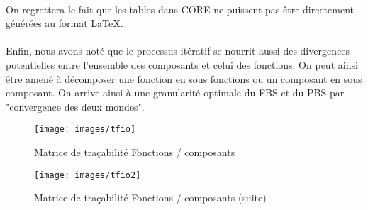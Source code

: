 \paragraph{}
On regrettera le fait que les tables dans CORE ne puissent pas être directement générées au format \LaTeX.

\paragraph{}
Enfin, nous avons noté que le processus itératif se nourrit aussi des divergences potentielles entre l'ensemble des composants et celui des fonctions. On peut ainsi être amené à décomposer une fonction en sous fonctions ou un composant en sous composant. On arrive ainsi à une granularité optimale du FBS et du PBS  par "convergence des deux mondes".  

\begin{landscape}

\begin{figure}[H]
	\begin{center}	
		\texttt{[image: images/tfio]}
		
		\caption{Matrice de traçabilité Fonctions / composants }
		\label{tfio}
	\end{center}
\end{figure}
	



	\begin{figure}[H]
		\begin{center}	
			\texttt{[image: images/tfio2]}
			\caption{Matrice de traçabilité Fonctions / composants (suite)}
			\label{tfio2}
		\end{center}
	\end{figure}
	
\end{landscape}